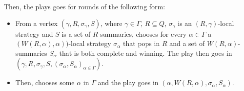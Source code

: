Then, the plays goes for rounds of the following form:
\begin{itemize}
	\item From a vertex $(\gamma,R,\sigma_\gamma,S)$, where $\gamma\in \Gamma$, $R\subseteq Q$, $\sigma_\gamma$ is an $(R,\gamma)$-local strategy and $S$ is a set of $R$-summaries, \Eve chooses for every $\alpha\in\Gamma$ a $(W(R,\alpha),\alpha))$-local strategy $\sigma_\alpha$ that pops in $R$ and a set of $ W(R,\alpha)$-summaries $S_\alpha$ that is both complete and winning. The play then goes in $(\gamma,R,\sigma_\gamma,S,(\sigma_\alpha,S_\alpha)_{\alpha\in\Gamma})$.
	\item Then, \Adam chooses some $\alpha$ in $\Gamma$ and the play goes in $(\alpha,W(R,\alpha),\sigma_\alpha,S_\alpha)$.
\end{itemize}


